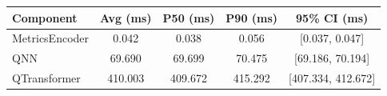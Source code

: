 \begin{tabular}{lcccc}
\toprule
Component & Avg (ms) & P50 (ms) & P90 (ms) & 95\% CI (ms) \\
\midrule
MetricsEncoder & 0.042 & 0.038 & 0.056 & [0.037, 0.047] \\
QNN & 69.690 & 69.699 & 70.475 & [69.186, 70.194] \\
QTransformer & 410.003 & 409.672 & 415.292 & [407.334, 412.672] \\
\bottomrule
\end{tabular}
